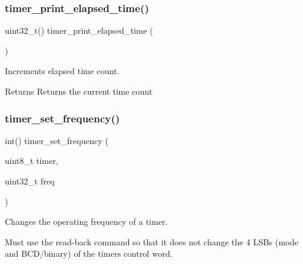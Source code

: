 \subsubsection{\texorpdfstring{timer\+\_\+print\+\_\+elapsed\+\_\+time()}{timer\_print\_elapsed\_time()}}
{\footnotesize\ttfamily uint32\+\_\+t() timer\+\_\+print\+\_\+elapsed\+\_\+time (\begin{DoxyParamCaption}{ }\end{DoxyParamCaption})}



Increments elapsed time count. 

\begin{DoxyReturn}{Returns}
Returns the current time count 
\end{DoxyReturn}
\mbox{\label{group__timer_gaf2c04fa8e97ffa748fd3f612886a92a7}} 
\subsubsection{\texorpdfstring{timer\+\_\+set\+\_\+frequency()}{timer\_set\_frequency()}}
{\footnotesize\ttfamily int() timer\+\_\+set\+\_\+frequency (\begin{DoxyParamCaption}\item[{uint8\+\_\+t}]{timer,  }\item[{uint32\+\_\+t}]{freq }\end{DoxyParamCaption})}



Changes the operating frequency of a timer. 

Must use the read-\/back command so that it does not change the 4 L\+S\+Bs (mode and B\+C\+D/binary) of the timer\textquotesingle{}s control word.


